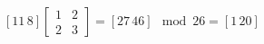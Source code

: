 \item $\left[11\hspace{2pt}8\right] \begin{bmatrix}1 & 2 \\ 2 & 3 \end{bmatrix} =\left[27\hspace{2pt}46\right]\mod 26=\left[1\hspace{2pt}20\right]$